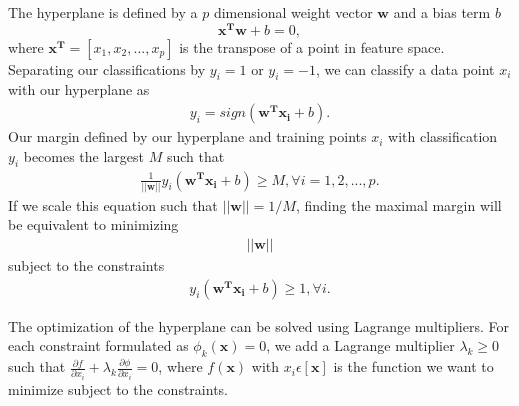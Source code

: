 The hyperplane is defined by a $p$ dimensional weight vector $\boldsymbol{w}$ and a 
bias term $b$
\begin{equation}
\boldsymbol{x^T}\boldsymbol{w} + b =0, 
\label{eq:hyperplane}
\end{equation}
where $\boldsymbol{x^T}=[x_1,x_2,...,x_p]$ is the transpose of a point in feature space.
Separating our classifications by $y_i=1$ or $y_i=-1$, we can classify a 
data point $x_i$ with our hyperplane as 
\begin{gather*}
y_i = sign(\boldsymbol{w^T}\boldsymbol{x_i}+b). 
\end{gather*}
Our margin defined by our hyperplane and training points $x_i$ with classification $y_i$ becomes the largest $M$ such that 
\begin{gather}
\frac{1}{||\boldsymbol{w}||}y_i(\boldsymbol{w^Tx_i}+b) \ge M, \forall i=1,2,...,p. 
\end{gather}
If we scale this equation such that $||\boldsymbol{w}||=1/M$, finding the maximal margin 
will be equivalent to minimizing 
\begin{gather*}
||\boldsymbol{w}||
\end{gather*}
subject to the constraints 
\begin{gather*}
y_i(\boldsymbol{w^Tx_i}+b) \ge 1, \forall i.
\end{gather*}

The optimization of the hyperplane can be solved using Lagrange multipliers. 
For each constraint formulated as $\phi_k (\boldsymbol{x})=0$, we add a Lagrange
multiplier $\lambda _k \ge 0$ such that $\frac{\partial f}{\partial x_i}+\lambda_k \frac{\partial \phi }{\partial x_i}=0$,
where $f(\boldsymbol{x})$ with $x_i \epsilon [\boldsymbol{x}]$ is the function we want to minimize 
subject to the constraints.

